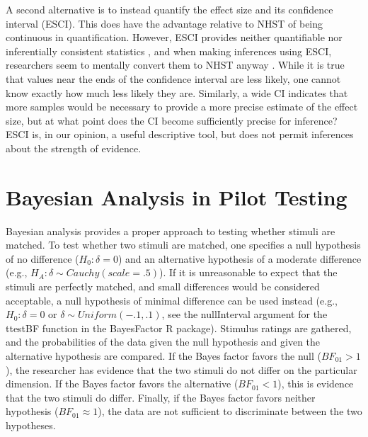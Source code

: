\documentclass[fignum,nobf,man]{apa}
\begin{document}
A second alternative is to instead quantify the effect size and its confidence interval (ESCI). This does have the advantage relative to NHST of being continuous in quantification.  However, ESCI provides neither quantifiable nor inferentially consistent statistics \citep[see][]{Morey:etal:2014}, and when making inferences using ESCI, researchers seem to mentally convert them to NHST anyway \citep{Hoekstra:etal:2014}. While it is true that values near the ends of the confidence interval are less likely, one cannot know exactly how much less likely they are. Similarly, a wide CI indicates that more samples would be necessary to provide a more precise estimate of the effect size, but at what point does the CI become sufficiently precise for inference? ESCI is, in our opinion, a useful descriptive tool, but does not permit inferences about the strength of evidence.

\section{Bayesian Analysis in Pilot Testing}
Bayesian analysis provides a proper approach to testing whether stimuli are matched. To test whether two stimuli are matched, one specifies a null hypothesis of no difference ($H_0: \delta{} = 0$) and an alternative hypothesis of a moderate difference (e.g., $H_A: \delta{} \sim{} Cauchy(scale = .5)$). If it is unreasonable to expect that the stimuli are perfectly matched, and small differences would be considered acceptable, a null hypothesis of minimal difference can be used instead (e.g., $H_0: \delta{} = 0$ or $\delta{} \sim{} Uniform(-.1, .1)$, see the nullInterval argument for the ttestBF function in the BayesFactor R package). Stimulus ratings are gathered, and the probabilities of the data given the null hypothesis and given the alternative hypothesis are compared. If the Bayes factor favors the null ($BF_{01} > 1$), the researcher has evidence that the two stimuli do not differ on the particular dimension. If the Bayes factor favors the alternative ($BF_{01} < 1$), this is evidence that the two stimuli do differ. Finally, if the Bayes factor favors neither hypothesis ($BF_{01} \approx 1$), the data are not sufficient to discriminate between the two hypotheses.
 
\end{document}
